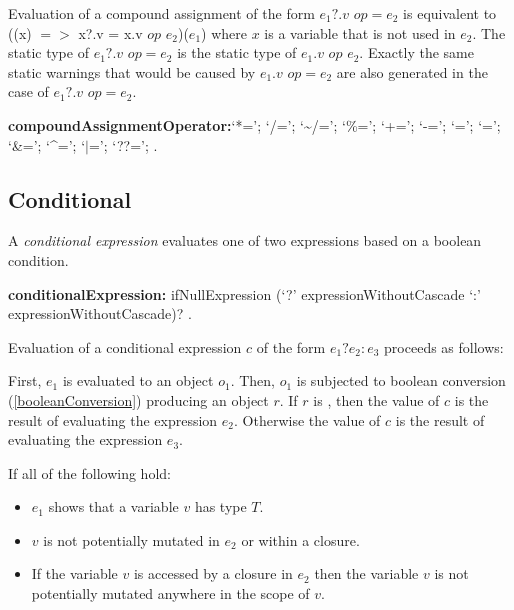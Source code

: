 \documentclass{article}
\newcommand{\code}[1]{{\sf #1}}
\begin{document}
\LMHash{}
Evaluation of a compound assignment of the form $e_1?.v$ $op = e_2$ is equivalent to \code{((x) $=>$ x?.v = x.v $op$ $e_2$)($e_1$)} where $x$ is a variable that is not used in $e_2$. The static type of $e_1?.v$ $op = e_2$ is the static type of $e_1.v$ $op$ $e_2$. Exactly the same static warnings that would be caused by $e_1.v$ $op = e_2$ are also generated in the case of $e_1?.v$ $op = e_2$.


\begin{grammar}
{\bf compoundAssignmentOperator:}`*=';
      `/=';
      `\~{}/=';
      `\%=';
      `+=';
      `-=';
      `{\escapegrammar \lt \lt}=';
       `{\escapegrammar \gt \gt}=';
      `\&=';
      `\^{}=';
      `$|$=';
      `??=';
    .
\end{grammar}

    
\subsection{ Conditional}

\LMHash{}
A {\em conditional expression} evaluates one of two expressions based on a boolean condition.

\begin{grammar}
  {\bf conditionalExpression:}
     ifNullExpression (`?' expressionWithoutCascade `{\escapegrammar :}' expressionWithoutCascade)?
    . %
\end{grammar}

\LMHash{}
Evaluation of a conditional expression $c$ of the form $e_1 ? e_2 : e_3$ proceeds as follows:

\LMHash{}
First, $e_1$ is evaluated to an object $o_1$.  Then, $o_1$ is  subjected to boolean conversion (\ref{booleanConversion}) producing an object $r$.  If $r$ is \TRUE, then the value of $c$ is the result of evaluating the expression $e_2$. Otherwise the value of $c$ is the result of evaluating the expression $e_3$. 

\LMHash{}
If all of the following hold:
\begin{itemize}
\item $e_1$ shows that a variable $v$ has type $T$.
\item $v$ is not potentially mutated in $e_2$ or within a closure.
\item If the variable $v$ is accessed by a closure in $e_2$ then the variable $v$ is not potentially mutated anywhere in the scope of $v$.
\end{itemize}
\end{document}
